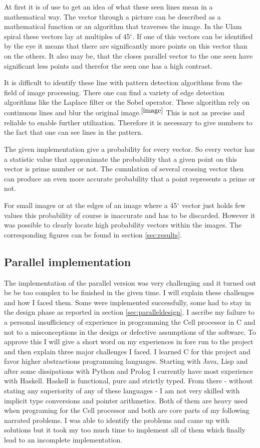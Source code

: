 At first it is of use to get an idea of what these seen lines mean in a mathematical way. The vector through a picture can be described as a mathematical function or an algorithm that traverses the image. In the Ulam spiral these vectors lay at multiples of 45$^\circ$.
If one of this vectors can be identified by the eye it means that there are significantly more points on this vector than on the others. It also may be, that the closes parallel vector to the one seen have significant less points and therefor the seen one has a high contrast.

It is difficult to identify these line with pattern detection algorithms from the field of image processing. There one can find a variety of edge detection algorithms like the Laplace filter or the Sobel operator. These algorithm rely on continuous lines and blur the original image.$^{\cite{image}}$ This is not as precise and reliable to enable further utilization. Therefore it is necessary to give numbers to the fact that one can see lines in the pattern. 

The given implementation give a probability for every vector. So every vector has a statistic value that approximate the probability that a given point on this vector is prime number or not. The cumulation of several crossing vector then can produce an even more accurate probability that a point represents a prime or not.

For small images or at the edges of an image where a 45$^\circ$ vector just holds few values this probability of course is inaccurate and has to be discarded. However it was possible to clearly locate high probability vectors within the images. The corresponding figures can be found in section \ref{sec:results}.

\subsection{Parallel implementation}
\label{sec:par_imp}
The implementation of the parallel version was very challenging and it turned out be be too complex to be finished in the given time. I will explain these challenges and how I faced them. Some were implemented successfully, some had to stay in the design phase as reported in section \ref{sec:paralleldesign}. I ascribe my failure to a personal insufficiency of experience in programming the Cell processor in C and not to a misconceptions in the design or defective assumptions of the software. To approve this I will give a short word on my experiences in fore run to the project and then explain three major challenges I faced.
I learned C for this project and favor higher abstractions programming languages. Starting with Java, Lisp  and after some dissipations with Python and Prolog I currently have most experience with Haskell. Haskell is functional, pure and strictly typed. From there - without stating any superiority of any of these languages - I am not very skilled with implicit type conversions and pointer arithmetics. Both of them are heavy used when programing for the Cell processor and both are core parts of my following narrated problems. I was able to identify the problems and came up with solutions but it took my too much time to implement all of them which finally lead to an incomplete implementation.

